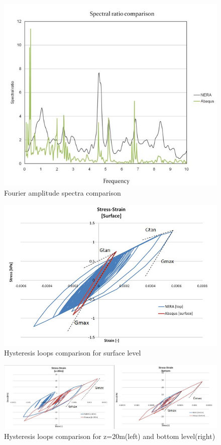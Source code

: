 	\begin{figure}[h!]
		\centering
		\includegraphics[width=0.7\linewidth]{"spectral2"}
		\caption{Fourier amplitude spectra comparison}
		\label{fourier2}
	\end{figure}
	
	\begin{figure}[h!]
		\centering
		\includegraphics[width=0.7\linewidth]{"tau_gamma1"}
		\caption{Hysteresis loops comparison for surface level}
		\label{tau_gamma1}
	\end{figure}
	
	\begin{figure}[h!]
		\centering
		\includegraphics[width=0.9\linewidth]{"tau_gamma2"}
		\caption{Hysteresis loops comparison for z=20m(left) and bottom level(right)}
		\label{tau_gamma2}
	\end{figure}
	
